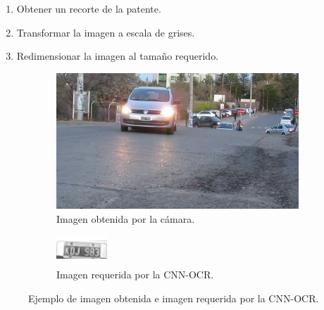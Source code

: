 \begin{enumerate}
    \item Obtener un recorte de la patente.
    \item Transformar la imagen a escala de grises.
    \item Redimensionar la imagen al tamaño requerido.
\end{enumerate}
\begin{figure}[bth]
    \centering
    \begin{subfigure}[b]{0.49\textwidth}
        \centering
        \includegraphics[width=\textwidth]{imgs/imagen-obtenida.jpg}
        \caption{Imagen obtenida por la cámara.}
        \label{fig:imagen-obtenida}
    \end{subfigure}
    \hfill
    \begin{subfigure}[b]{0.49\textwidth}
        \centering
        \includegraphics[width=\textwidth]{imgs/imagen-requerida.jpg}
        \caption{Imagen requerida por la CNN-OCR.}
        \label{fig:imagen-requerida}
    \end{subfigure}
    \caption{Ejemplo de imagen obtenida e imagen requerida por la CNN-OCR.}
    \label{fig:Comparativa-imagenes}
\end{figure}

